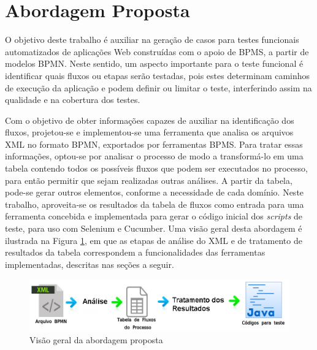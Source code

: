 \documentclass[12pt]{article}
\begin{document}
\section{Abordagem Proposta}\label{sec:abordagem}

O objetivo deste trabalho é auxiliar na geração de casos para testes funcionais automatizados de aplicações Web construídas com o apoio de BPMS, a partir de modelos BPMN. Neste sentido, um aspecto importante para o teste funcional é identificar quais fluxos ou etapas serão testadas, pois estes determinam caminhos de execução da aplicação e podem definir ou limitar o teste, interferindo assim na qualidade e na cobertura dos testes. 

Com o objetivo de obter informações capazes de auxiliar na identificação dos fluxos, projetou-se e implementou-se uma ferramenta que analisa os arquivos XML no formato BPMN, exportados por ferramentas BPMS.  Para tratar essas informações, optou-se por analisar o processo de modo a transformá-lo em uma tabela contendo todos os possíveis fluxos que podem ser executados no processo, para então permitir que sejam realizadas outras análises. A partir da tabela, pode-se gerar outros elementos, conforme a necessidade de cada domínio. Neste trabalho, aproveita-se os resultados da tabela de fluxos como entrada para uma ferramenta concebida e implementada para gerar o código inicial dos \emph{scripts} de teste, para uso com Selenium e Cucumber. Uma visão geral desta abordagem é ilustrada na Figura \ref{fig:abordagem1}, em que as etapas de análise do XML e de tratamento de resultados da tabela correspondem a funcionalidades das ferramentas implementadas, descritas nas seções a seguir.



\begin{figure}[ht]
\centering
\includegraphics[width=.9\textwidth]{figuras/abordagemTotal2.png}
\caption{Visão geral da abordagem proposta}
\label{fig:abordagem1}
\end{figure}
\end{document}
